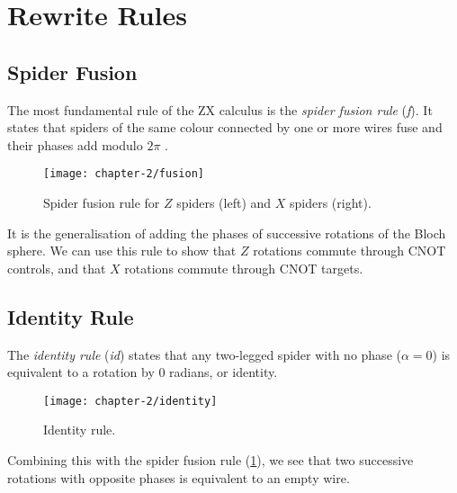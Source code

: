 \section{Rewrite Rules}%
\label{rewrite-rules}


\subsection{Spider Fusion}%
The most fundamental rule of the ZX calculus is the \textit{spider fusion rule} (\textit{f}). It states that spiders of the same colour connected by one or more wires fuse and their phases add modulo $2\pi$ \cite{Wetering2020}.

\begin{figure}[H]
    \centering
    \texttt{[image: chapter-2/fusion]}
    \caption{Spider fusion rule for $Z$ spiders (left) and $X$ spiders (right).}
    \label{spider-fusion}
\end{figure}

It is the generalisation of adding the phases of successive rotations of the Bloch sphere. We can use this rule to show that $Z$ rotations commute through CNOT controls, and that $X$ rotations commute through CNOT targets.



\subsection{Identity Rule}%

The \textit{identity rule} (\textit{id}) states that any two-legged spider with no phase ($\alpha = 0$) is equivalent to a rotation by 0 radians, or identity.

\begin{figure}[H]
    \centering
    \texttt{[image: chapter-2/identity]}
    \caption{Identity rule.}
    \label{identity}
\end{figure}

Combining this with the spider fusion rule (\ref{spider-fusion}), we see that two successive rotations with opposite phases is equivalent to an empty wire.


